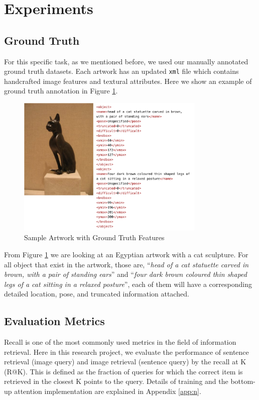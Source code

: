 \section{Experiments}

\subsection{Ground Truth}

For this specific task, as we mentioned before, we used our manually annotated ground truth datasets. Each artwork has an updated \verb|xml| file which contains handcrafted image features and textural attributes. Here we show an example of ground truth annotation in Figure \ref{fig:sampledata}.

\begin{figure}[h!]
\centering
\includegraphics[width=0.8\textwidth]{sampledata.pdf}
\caption{Sample Artwork with Ground Truth Features}
\label{fig:sampledata}
\end{figure}

From Figure \ref{fig:sampledata} we are looking at an Egyptian artwork with a cat sculpture. For all object that exist in the artwork, those are, ``\textit{head of a    cat statuette carved in brown, with a pair of standing ears}'' and ``\textit{four dark brown coloured thin shaped legs of a cat sitting in a relaxed posture}'', each of them will have a corresponding detailed location, pose, and truncated information attached. 

\subsection{Evaluation Metrics}

Recall is one of the most commonly used metrics in the field of information retrieval. Here in this research project, we evaluate the performance of sentence retrieval (image query) and image retrieval (sentence query) by the recall at K (R@K). This is defined as the fraction of queries for which the correct item is retrieved in the closest K points to the query. Details of training and the bottom-up attention implementation are explained in Appendix \ref{app:n}.

